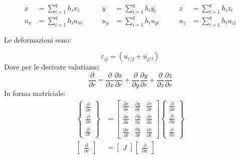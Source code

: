 \begin{align*}
    x&=\sum^q_{i=1}h_ix_i\qquad &y&=\sum^q_{i=1}h_iy_i\qquad  & z&=\sum^q_{i=1}h_iz_i\\
     u_x&=\sum^q_{i=1}h_iu_{xi}\qquad &u_y&=\sum^q_{i=1}h_iu_{yi}\qquad  & u_z&=\sum^q_{i=1}h_i u_{zi}
\end{align*}

Le deformazioni sono:

\begin{equation*}
    \varepsilon_{ij}=(u_{i/j} +u_{j/i})
\end{equation*}
Dove per le derivate valutiamo:
\begin{equation*}
    \frac{\partial }{\partial r}=   \frac{\partial }{\partial x}  \frac{\partial x}{\partial r}+  \frac{\partial }{\partial y}  \frac{\partial y}{\partial r}+
      \frac{\partial }{\partial z}  \frac{\partial z}{\partial r}
\end{equation*}
In forma matriciale:
\begin{align*}
    \begin{Bmatrix}
          \frac{\partial }{\partial r}\\  \frac{\partial }{\partial s}\\  \frac{\partial }{\partial t}
    \end{Bmatrix}&=
\begin{bmatrix}
    \frac{\partial x}{\partial r} & \frac{\partial y}{\partial r} & \frac{\partial z}{\partial r}\\
    \frac{\partial x}{\partial s} & \frac{\partial y}{\partial s} & \frac{\partial z}{\partial s}\\
    \frac{\partial x}{\partial t} & \frac{\partial y}{\partial t} & \frac{\partial z}{\partial t}
\end{bmatrix}
     \begin{Bmatrix}
          \frac{\partial }{\partial x}\\  \frac{\partial }{\partial y}\\  \frac{\partial }{\partial z}
    \end{Bmatrix}\\
    \begin{bmatrix}
          \frac{\partial }{\partial r}
    \end{bmatrix}&=\begin{bmatrix}
          J
    \end{bmatrix} \begin{bmatrix}
          \frac{\partial }{\partial x}
    \end{bmatrix}
\end{align*}

